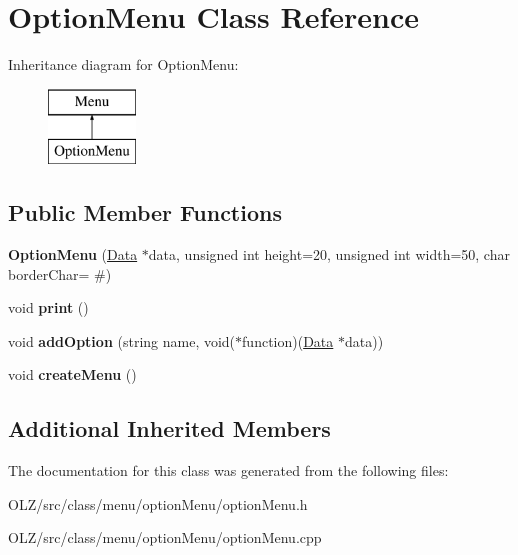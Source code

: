 \hypertarget{class_option_menu}{}\section{Option\+Menu Class Reference}
\label{class_option_menu}
Inheritance diagram for Option\+Menu\+:\begin{figure}[H]
\begin{center}
\leavevmode
\includegraphics[height=2.000000cm]{class_option_menu}
\end{center}
\end{figure}
\subsection*{Public Member Functions}
\begin{DoxyCompactItemize}
\item 
\hypertarget{class_option_menu_a651f6287811f411ff2c84f0fbe03dcb0}{}{\bfseries Option\+Menu} (\hyperlink{class_data}{Data} $\ast$data, unsigned int height=20, unsigned int width=50, char border\+Char= \textquotesingle{}\#\textquotesingle{})\label{class_option_menu_a651f6287811f411ff2c84f0fbe03dcb0}

\item 
\hypertarget{class_option_menu_a753b91d8c99330c962d6ecbe520800d2}{}void {\bfseries print} ()\label{class_option_menu_a753b91d8c99330c962d6ecbe520800d2}

\item 
\hypertarget{class_option_menu_a82ce2285fb79bec7073b5358648f19b6}{}void {\bfseries add\+Option} (string name, void($\ast$function)(\hyperlink{class_data}{Data} $\ast$data))\label{class_option_menu_a82ce2285fb79bec7073b5358648f19b6}

\item 
\hypertarget{class_option_menu_a30620df0e9871ce3bbdccf3cb094785f}{}void {\bfseries create\+Menu} ()\label{class_option_menu_a30620df0e9871ce3bbdccf3cb094785f}

\end{DoxyCompactItemize}
\subsection*{Additional Inherited Members}


The documentation for this class was generated from the following files\+:\begin{DoxyCompactItemize}
\item 
O\+L\+Z/src/class/menu/option\+Menu/option\+Menu.\+h\item 
O\+L\+Z/src/class/menu/option\+Menu/option\+Menu.\+cpp\end{DoxyCompactItemize}
